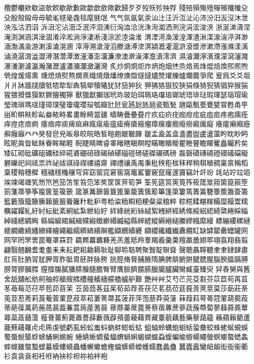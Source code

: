 欖鬱欟欸欷盜欹飮歇歃歉歐歙歔歛歟歡歸⽍歹歿殀殄殃殍
殘殕殞殤殪殫殯殲殱⽎殳殷殼毆⽏毋毓毟毬毫毳毯麾氈氓
⽓气氛氤氣汞汕汢汪沂沍沚沁沛汾汨汳沒沐泄泱泓沽泗泅
泝沮沱沾沺泛泯泙泪洟衍洶洫洽洸洙洵洳洒洌浣涓浤浚浹
浙涎涕濤涅淹渕渊涵淇淦涸淆淬淞淌淨淒淅淺淙淤淕淪淮
渭湮渮渙湲湟渾渣湫渫湶湍渟湃渺湎渤滿渝游溂溪溘滉溷
滓溽溯滄溲滔滕溏溥滂溟潁漑灌滬滸滾漿滲漱滯漲滌漾漓
滷澆潺潸澁澀潯潛濳潭澂潼潘澎澑濂潦澳澣澡澤澹濆澪濟
濕濬濔濘濱濮濛瀉瀋濺瀑瀁瀏濾瀛瀚潴瀝瀘瀟瀰瀾瀲灑灣
炙炒炯烱炬炸炳炮烟烋烝烙焉烽焜焙煥煕熈煦煢煌煖煬熏
燻熄熕熨熬燗熹熾燒燉燔燎燠燬燧燵燼燹燿爍爐爛爨爭爬
爰爲⽘爻爼⽙爿牀牆牋牘牴牾犂犁犇犒犖犢犧犹犲狃狆狄
狎狒狢狠狡狹狷倏猗猊猜猖猝猴猯猩猥猾獎獏默獗獪獨獰
獸獵獻獺珈玳珎玻珀珥珮珞璢琅瑯琥珸琲琺瑕琿瑟瑙瑁瑜
瑩瑰瑣瑪瑶瑾璋璞璧瓊瓏瓔珱瓠瓣瓧瓩瓮瓲瓰瓱瓸瓷甄甃
甅甌甎甍甕甓甞甦甬甼畄畍畊畉畛畆畚畩畤畧畫畭畸當疆
疇畴疊疉疂疔疚疝疥疣痂疳痃疵疽疸疼疱痍痊痒痙痣痞痾
痿痼瘁痰痺痲痳瘋瘍瘉瘟瘧瘠瘡瘢瘤瘴瘰瘻癇癈癆癜癘癡
癢癨癩癪癧癬癰癲⽨癶癸發皀皃皈皋皎皖皓皙皚皰皴皸皹
皺盂盍盖盒盞盡盥盧盪蘯盻眈眇眄眩眤眞眥眦眛眷眸睇睚
睨睫睛睥睿睾睹瞎瞋瞑瞠瞞瞰瞶瞹瞿瞼瞽瞻矇矍矗矚矜矣
矮矼砌砒礦砠礪硅碎硴碆硼碚碌碣碵碪碯磑磆磋磔碾碼磅
磊磬磧磚磽磴礇礒礑礙礬礫祀祠祗祟祚祕祓祺祿禊禝禧齋
禪禮禳禹禺秉秕秧秬秡秣稈稍稘稙稠稟禀稱稻稾稷穃穗穉
穡穢穩龝穰穹穽窈窗窕窘窖窩竈窰窶竅竄窿邃竇竊竍竏竕
竓站竚竝竡竢竦竭竰笂笏笊笆笳笘笙笞笵笨笶筐筺笄筍笋
筌筅筵筥筴筧筰筱筬筮箝箘箟箍箜箚箋箒箏筝箙篋篁篌篏
箴篆篝篩簑簔篦篥籠簀簇簓篳篷簗簍篶簣簧簪簟簷簫簽籌
籃籔籏籀籐籘籟籤籖籥籬籵粃粐粤粭粢粫粡粨粳粲粱粮粹
粽糀糅糂糘糒糜糢鬻糯糲糴糶糺紆紂紜紕紊絅絋紮紲紿紵
絆絳絖絎絲絨絮絏絣經綉絛綏絽綛綺綮綣綵緇綽綫總綢綯
緜綸綟綰緘緝緤緞緻緲緡縅縊縣縡縒縱縟縉縋縢繆繦縻縵
縹繃縷縲縺繧繝繖繞繙繚繹繪繩繼繻纃緕繽辮繿纈纉續纒
纐纓纔纖纎纛纜缸缺罅罌罍罎罐⽹网罕罔罘罟罠罨罩罧罸
羂羆羃羈羇羌羔羞羝羚羣羯羲羹羮羶羸譱翅翆翊翕翔翡翦
翩翳翹飜耆耄耋⽾耒耘耙耜耡耨耿耻聊聆聒聘聚聟聢聨聳
聲聰聶聹聽⾀聿肄肆肅肛肓肚肭冐肬胛胥胙胝胄胚胖脉胯
胱脛脩脣脯腋隋腆脾腓腑胼腱腮腥腦腴膃膈膊膀膂膠膕膤
膣腟膓膩膰膵膾膸膽臀臂膺臉臍臑臙臘臈臚臟臠臧臺臻臾
舁舂舅與舊舍舐舖舩舫舸舳艀艙艘艝艚艟艤艢艨艪艫舮艱
艷⾋艸艾芍芒芫芟芻芬苡苣苟苒苴苳苺莓范苻苹苞茆苜茉
苙茵茴茖茲茱荀茹荐荅茯茫茗茘莅莚莪莟莢莖茣莎莇莊荼
莵荳荵莠莉莨菴萓菫菎菽萃菘萋菁菷萇菠菲萍萢萠莽萸蔆
菻葭萪萼蕚蒄葷葫蒭葮蒂葩葆萬葯葹萵蓊葢蒹蒿蒟蓙蓍蒻
蓚蓐蓁蓆蓖蒡蔡蓿蓴蔗蔘蔬蔟蔕蔔蓼蕀蕣蕘蕈蕁蘂蕋蕕薀
薤薈薑薊薨蕭薔薛藪薇薜蕷蕾薐藉薺藏薹藐藕藝藥藜藹蘊
蘓蘋藾藺蘆蘢蘚蘰蘿⾌虍乕虔號虧虱蚓蚣蚩蚪蚋蚌蚶蚯蛄
蛆蚰蛉蠣蚫蛔蛞蛩蛬蛟蛛蛯蜒蜆蜈蜀蜃蛻蜑蜉蜍蛹蜊蜴蜿
蜷蜻蜥蜩蜚蝠蝟蝸蝌蝎蝴蝗蝨蝮蝙蝓蝣蝪蠅螢螟螂螯蟋螽
蟀蟐雖螫蟄螳蟇蟆螻蟯蟲蟠蠏蠍蟾蟶蟷蠎蟒蠑蠖蠕蠢蠡蠱
蠶蠹蠧蠻衄衂衒衙衞衢衫袁衾袞衵衽袵衲袂袗袒袮袙袢袍
